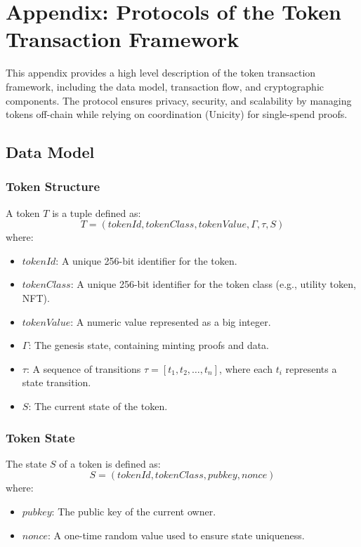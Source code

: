 \section{Appendix: Protocols of the Token Transaction Framework}

This appendix provides a high level description of the token transaction framework, including the data model, transaction flow, and cryptographic components. The protocol ensures privacy, security, and scalability by managing tokens off-chain while relying on coordination (Unicity) for single-spend proofs.


\subsection{Data Model}

\subsubsection{Token Structure}

A token \( T \) is a tuple defined as:
\[
T = (tokenId, tokenClass, tokenValue, \Gamma, \tau, S)
\]
where:
\begin{itemize}
	\item \( tokenId \): A unique 256-bit identifier for the token.
	\item \( tokenClass \): A unique 256-bit identifier for the token class (e.g., utility token, NFT).
	\item \( tokenValue \): A numeric value represented as a big integer.
	\item \( \Gamma \): The genesis state, containing minting proofs and data.
	\item \( \tau \): A sequence of transitions \( \tau = [t_1, t_2, \dots, t_n] \), where each \( t_i \) represents a state transition.
	\item \( S \): The current state of the token.
\end{itemize}


\subsubsection{Token State}

The state \( S \) of a token is defined as:
\[
S = (tokenId, tokenClass, pubkey, nonce)
\]
where:
\begin{itemize}
	\item \( pubkey \): The public key of the current owner.
	\item \( nonce \): A one-time random value used to ensure state uniqueness.
\end{itemize}


